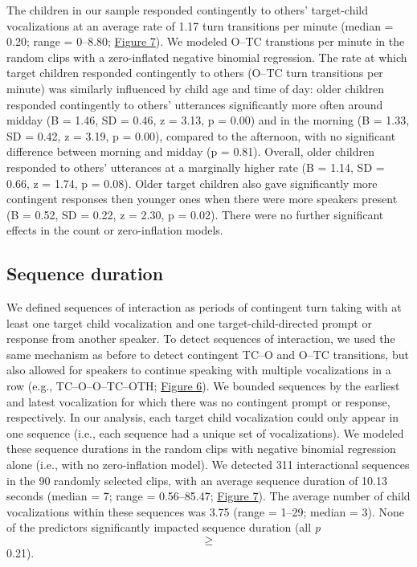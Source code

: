 \documentclass[floatsintext,man]{apa6}
\theoremstyle{definition}
\theoremstyle{definition}
\theoremstyle{definition}
\theoremstyle{remark}
\begin{document}
The children in our sample responded contingently to others'
target-child vocalizations at an average rate of 1.17 turn transitions
per minute (median = 0.20; range = 0--8.80;
\protect\hyperlink{fig7}{Figure 7}). We modeled O--TC transtions per
minute in the random clips with a zero-inflated negative binomial
regression. The rate at which target children responded contingently to
others (O--TC turn transitions per minute) was similarly influenced by
child age and time of day: older children responded contingently to
others' utterances significantly more often around midday (B = 1.46, SD
= 0.46, z = 3.13, p = 0.00) and in the morning (B = 1.33, SD = 0.42, z =
3.19, p = 0.00), compared to the afternoon, with no significant
difference between morning and midday (p = 0.81). Overall, older
children responded to others' utterances at a marginally higher rate (B
= 1.14, SD = 0.66, z = 1.74, p = 0.08). Older target children also gave
significantly more contingent responses then younger ones when there
were more speakers present (B = 0.52, SD = 0.22, z = 2.30, p = 0.02).
There were no further significant effects in the count or zero-inflation
models.

\subsection{Sequence duration}\label{sequence-duration}

We defined sequences of interaction as periods of contingent turn taking
with at least one target child vocalization and one
target-child-directed prompt or response from another speaker. To detect
sequences of interaction, we used the same mechanism as before to detect
contingent TC--O and O--TC transitions, but also allowed for speakers to
continue speaking with multiple vocalizations in a row (e.g.,
TC--O--O--TC--OTH; \protect\hyperlink{fig6}{Figure 6}). We bounded
sequences by the earliest and latest vocalization for which there was no
contingent prompt or response, respectively. In our analysis, each
target child vocalization could only appear in one sequence (i.e., each
sequence had a unique set of vocalizations). We modeled these sequence
durations in the random clips with negative binomial regression alone
(i.e., with no zero-inflation model). We detected 311 interactional
sequences in the 90 randomly selected clips, with an average sequence
duration of 10.13 seconds (median = 7; range = 0.56--85.47;
\protect\hyperlink{fig7}{Figure 7}). The average number of child
vocalizations within these sequences was 3.75 (range = 1--29; median =
3). None of the predictors significantly impacted sequence duration (all
\emph{p} \[\ge\] 0.21).
\end{document}
